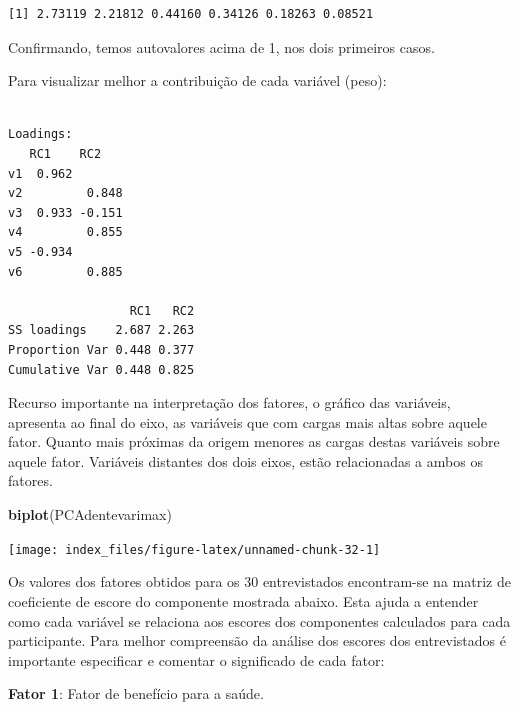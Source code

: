 \documentclass[12pt,brazil,oneside]{book}
\newenvironment{Shaded}{\begin{snugshade}}{\end{snugshade}}
\newcommand{\KeywordTok}[1]{\textcolor[rgb]{0.13,0.29,0.53}{\textbf{#1}}}
\newcommand{\NormalTok}[1]{#1}
\newcommand{\OperatorTok}[1]{\textcolor[rgb]{0.81,0.36,0.00}{\textbf{#1}}}
\begin{document}
\begin{verbatim}
[1] 2.73119 2.21812 0.44160 0.34126 0.18263 0.08521
\end{verbatim}

Confirmando, temos autovalores acima de 1, nos dois primeiros casos.

Para visualizar melhor a contribuição de cada variável (peso):

\begin{Shaded}
\end{Shaded}

\begin{verbatim}

Loadings:
   RC1    RC2   
v1  0.962       
v2         0.848
v3  0.933 -0.151
v4         0.855
v5 -0.934       
v6         0.885

                 RC1   RC2
SS loadings    2.687 2.263
Proportion Var 0.448 0.377
Cumulative Var 0.448 0.825
\end{verbatim}

Recurso importante na interpretação dos fatores, o gráfico das
variáveis, apresenta ao final do eixo, as variáveis que com cargas mais
altas sobre aquele fator. Quanto mais próximas da origem menores as
cargas destas variáveis sobre aquele fator. Variáveis distantes dos dois
eixos, estão relacionadas a ambos os fatores.

\begin{Shaded}
\begin{Highlighting}[]
\KeywordTok{biplot}\NormalTok{(PCAdentevarimax)}
\end{Highlighting}
\end{Shaded}

\begin{center}\texttt{[image: index\_files/figure-latex/unnamed-chunk-32-1]} \end{center}

Os valores dos fatores obtidos para os 30 entrevistados encontram-se na
matriz de coeficiente de escore do componente mostrada abaixo. Esta
ajuda a entender como cada variável se relaciona aos escores dos
componentes calculados para cada participante. Para melhor compreensão
da análise dos escores dos entrevistados é importante especificar e
comentar o significado de cada fator:

\textbf{Fator 1}: Fator de benefício para a saúde.
\end{document}
